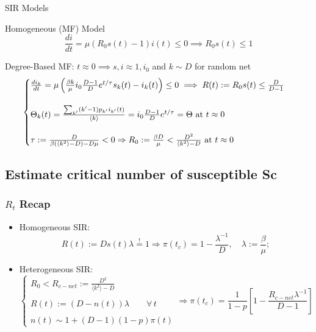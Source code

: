 \documentclass{beamer}
\begin{document}
\begin{frame}{SIR Models}
	\vspace{-1mm}
	\begin{block}{Homogeneous (MF) Model}
		\begin{equation}
				\frac{di}{dt} = \mu( R_0 s(t) - 1) i(t) \leq 0  \implies R_0s(t) \leq 1
		\end{equation} 
	\end{block}
	\begin{block}{Degree-Based MF: $t \approx 0 \implies s,i \approx 1,i_0$ and $k\sim D$ for random net}
		\begin{equation}
			\begin{cases}
				\frac{di_k}{dt} = \mu \left(\frac{\beta k}{\mu} i_0 \frac{ D - 1}{D} e^{t/\tau}  s_k(t) - i_k(t) \right) \leq 0 \implies  R(t):=R_0s(t) \leq \frac{D}{D-1}\\ \\
				\Theta_k(t) = \frac{\sum_{k'} (k'-1)p_{k'}i_{k'}(t)}{\langle k \rangle} =
				i_0 \frac{D - 1}{D} e^{t/\tau}= \Theta \textnormal{ at } t \approx 0 \\ \\
				\tau := \frac{D}{\beta(\langle k^2 \rangle -D)-D \mu} < 0 \Rightarrow 
						R_0 := \frac{\beta D}{\mu} < \frac{D^{2}}{\langle k^2 \rangle - D} \textnormal{ at } t \approx 0
			\end{cases}	
		\end{equation}
	\end{block}
\end{frame}

\subsection*{Estimate critical number of susceptible Sc}
\begin{frame}
	\frametitle{$R_t$ Recap}
	\begin{itemize}
		\item Homogeneous SIR:
		\begin{equation}
			R(t):= D s(t) \lambda \stackrel{!}{=} 1 \Rightarrow  \pi(t_c) = 1 - \frac{\lambda^{-1}}{D}, \quad \lambda:= \frac{\beta}{\mu};
		\end{equation}
		\item Heterogeneous SIR:	
		\begin{equation}
			\begin{cases}
				R_0 < R_{c-net} := \frac{D^{2}}{ \langle k^2 \rangle - D} \\ \\
				R(t):=(D-n(t))\lambda \qquad \forall \, t \\ \\
				n(t) \sim 1+(D-1)(1-p)\pi(t)
			\end{cases}
			\Rightarrow \pi(t_{c}) = \frac{1}{1-p} 
			\left[1- \frac{R_{c-net} \lambda^{-1}}{D-1} \right]
		\end{equation}
	\end{itemize}
\end{frame}
\end{document}
